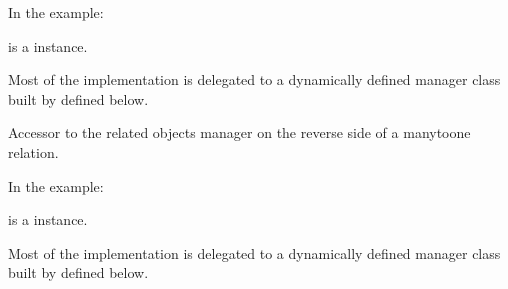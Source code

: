 \documentclass[a4paper,11pt,spanish]{sphinxmanual}
\begin{document}
\begin{fulllineitems}
\begin{fulllineitems}
\sphinxAtStartPar
In the example:

\begin{sphinxVerbatim}[commandchars=\\\{\}]
       
\end{sphinxVerbatim}

\sphinxAtStartPar
{} is a  instance.

\sphinxAtStartPar
Most of the implementation is delegated to a dynamically defined manager
class built by  defined below.

\end{fulllineitems}


\begin{fulllineitems}
\label{\detokenize{api/inventory/inventory.models:inventory.models.Location.lotstock_set}}
\pysigstartsignatures
\pysigline
{}
\pysigstopsignatures
\sphinxAtStartPar
Accessor to the related objects manager on the reverse side of a
many\sphinxhyphen{}to\sphinxhyphen{}one relation.

\sphinxAtStartPar
In the example:

\begin{sphinxVerbatim}[commandchars=\\\{\}]
       
\end{sphinxVerbatim}

\sphinxAtStartPar
{} is a  instance.

\sphinxAtStartPar
Most of the implementation is delegated to a dynamically defined manager
class built by  defined below.


\end{fulllineitems}
\end{fulllineitems}
\end{document}
